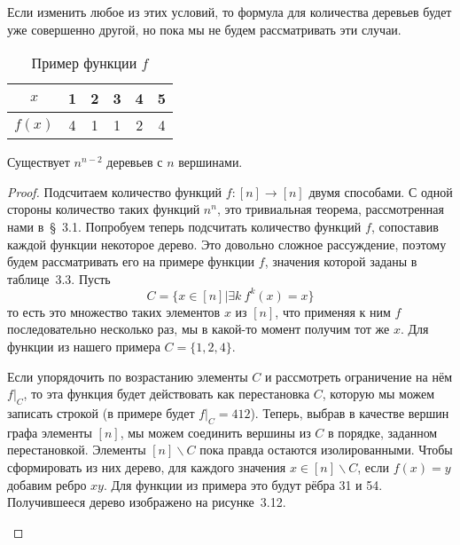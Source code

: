 Если изменить любое из этих условий, то формула для количества деревьев будет уже совершенно другой, но пока мы не будем рассматривать эти случаи.

\begin{table}[h]
\centering
\begin{tabular}{c|ccccc}
$x$ & 1 & 2 & 3 & 4 & 5 \\
\hline
$f(x)$ & 4 & 1 & 1 & 2 & 4
\end{tabular}
\caption{Пример функции $f$}
\end{table}

\begin{thm}
Существует $n^{n-2}$ деревьев с $n$ вершинами.
\end{thm}
\begin{proof}
Подсчитаем количество функций $f:[n]\to[n]$ двумя способами. С одной стороны количество таких функций $n^n$, это тривиальная теорема, рассмотренная нами в~\S~3.1. Попробуем теперь подсчитать количество функций $f$, сопоставив каждой функции некоторое дерево. Это довольно сложное рассуждение, поэтому будем рассматривать его на примере функции $f$, значения которой заданы в таблице~3.3. Пусть
$$C = \{x \in[n]| \exists k\ f^k(x) = x\}$$
то есть это множество таких элементов $x$ из $[n]$, что применяя к ним $f$ последовательно несколько раз, мы в какой-то момент получим тот же $x$. Для функции из нашего примера $C = \{1,2,4\}$.

Если упорядочить по возрастанию элементы $C$ и рассмотреть ограничение на нём $f|_C$, то эта функция будет действовать как перестановка $C$, которую мы можем записать строкой (в примере будет $f|_C = 412$). Теперь, выбрав в качестве вершин графа элементы $[n]$, мы можем соединить вершины из $C$ в порядке, заданном перестановкой. Элементы $[n]\backslash C$ пока правда остаются изолированными. Чтобы сформировать из них дерево, для каждого значения $x\in [n]\backslash C$, если $f(x)=y$ добавим ребро $xy$. Для функции из примера это будут рёбра 31 и 54. Получившееся дерево изображено на рисунке~3.12.

\begin{figure}[h]
\centering
{}
\end{figure}
\end{proof}
